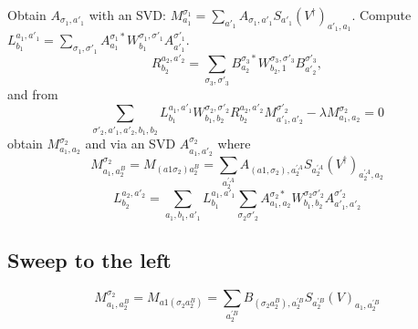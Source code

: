 \documentclass[showpacs,preprintnumbers,amsmath,amssymb,superscriptaddress,showkeys,pre]{revtex4}
\begin{document}
Obtain $A_{\sigma_1,a'_1}$ with an SVD: $M^{\sigma_1}_{a_1} = \sum_{a'_1} A_{\sigma_1,a'_1} S_{a'_1} (V^\dagger)_{a'_1,a_1}$.
Compute $L^{a_1,a'_1}_{b_1} = \sum_{\sigma_1,\sigma'_1} A^{\sigma_1 *}_{a_1} W^{\sigma_1,\sigma'_1}_{b_1} A^{\sigma'_1}_{a'_1}$.
\begin{equation}
R_{b_2}^{a_2,a'_2} =  \sum_{\sigma_3,\sigma'_3} B^{\sigma_3 *}_{a_2}
W^{\sigma_3,\sigma'_3}_{b_2,1} B^{\sigma'_3}_{a'_2},
\end{equation}
and from
\begin{equation}
\sum_{\sigma'_2,a'_1,a'_2,b_1,b_2} L^{a_1,a'_1}_{b_1} W^{\sigma_2,\sigma'_2}_{b_1,b_2} R_{b_2}^{a_2,a'_2} M^{\sigma'_2}_{a'_1,a'_2} - \lambda M^{\sigma_2}_{a_1,a_2}=0
\end{equation}
obtain $M^{\sigma_2}_{a_1,a_2}$ and via an SVD $A^{\sigma_2}_{a_1,a'_2}$ where
 \begin{equation}
M^{\sigma_2}_{a_1,a^B_2}=M_{(a1\sigma_2)a^B_2}=\sum_{a^{'A}_2} A_{(a1,\sigma_2),a^{'A}_2} S_{a^{'A}_2}(V^\dagger)_{a^{'A}_2,a_2}
\end{equation}
\begin{equation}
L^{a_2,a'_2}_{b_2} = \sum_{a_1,b_1,a'_1} L^{a_1,a'_1}_{b_1} \sum_{\sigma_2\sigma'_2} A^{\sigma_2 *}_{a_1,a_2} W^{\sigma_2\sigma'_2}_{b_1,b_2}A^{\sigma'_2}_{a'_1,a'_2}
\end{equation}

\subsection{Sweep to the left}

 \begin{equation}
M^{\sigma_2}_{a_1,a^B_2}=M_{a1(\sigma_2a^B_2)}=\sum_{a^{'B}_2} B_{(\sigma_2a^B_2),a^{'B}_2} S_{a^{'B}_2}(V)_{a_1,a^{'B}_2}
\end{equation}
\end{document}
